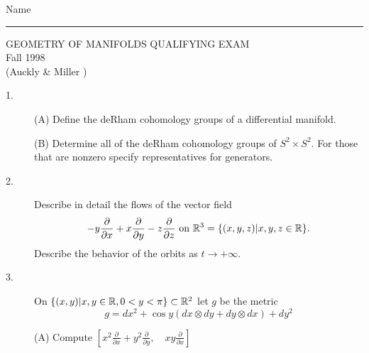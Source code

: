 \documentclass[bbb]{report}
\def\R{{\Bbb R}}
\begin{document}

\begin{Large}

\hfill Name \rule{2.5in}{.01in}
\par
\vspace{.1in}

\begin{center}
   GEOMETRY OF MANIFOLDS QUALIFYING EXAM \\
   Fall 1998 \\
   (Auckly \& Miller ) \\
\end{center}


\vspace{.1in}

\begin{large}\begin{center}
\end{center}\end{large}

\vspace{.05in}

\begin{description}

\item[1.] (A)
Define the deRham cohomology groups of a differential manifold.

\vspace{.1in}
\item[\quad] (B)
Determine all of the deRham cohomology groups of $S^2\times S^2$.
For those that are nonzero specify representatives for generators.



\vspace{.5in}

\item[2.]
Describe in detail the flows of the vector field
$$ -y\frac{\partial}{\partial x}
   +x\frac{\partial}{\partial y}
   -z\frac{\partial}{\partial z} \ \hbox{on}\ \R^3=
   \{(x,y,z)\vert x,y,z\in\R\}.
   $$
Describe the behavior of the orbits as $t\to +\infty$.

\vspace{.5in}

\item[3.]
On $\{(x,y)\vert x,y\in\R,0<y<\pi\}\subset\R^2$
let $g$ be the metric
$$ g= dx^2+\cos y(dx\otimes dy+dy\otimes dx)+dy^2 $$

\vspace{.1in}
\item[\quad] (A)
Compute
$\left[ x^2\frac{\partial}{\partial x}+y^2\frac{\partial}{\partial y},
 \quad xy\frac{\partial}{\partial x} \right] $


\end{description}
\end{Large}
\end{document}

